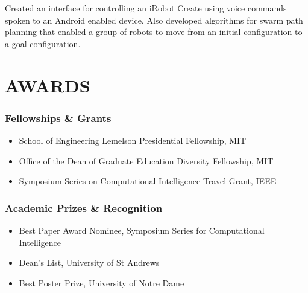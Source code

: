 \documentclass[line,margin]{cv}
\begin{document}
\begin{resume}
\begin{adjustwidth}{2.5em}{2.5em}
    Created an interface for controlling an iRobot Create using voice commands
    spoken to an Android enabled device. Also developed algorithms for swarm
    path planning that enabled a group of robots to move from an initial
    configuration to a goal configuration.

\end{adjustwidth}

% 
% 
% 

\section{AWARDS}

\subsubsection{Fellowships \& Grants}

\begin{itemize}

    \item School of Engineering Lemelson Presidential Fellowship, MIT
    \item Office of the Dean of Graduate Education Diversity Fellowship, MIT
    \item Symposium Series on Computational Intelligence Travel Grant, IEEE

\end{itemize}

\subsubsection{Academic Prizes \& Recognition}

\begin{itemize}

    \item Best Paper Award Nominee, Symposium Series for Computational
        Intelligence
    \item Dean's List, University of St Andrews
    \item Best Poster Prize, University of Notre Dame


\end{itemize}
\end{resume}
\end{document}
